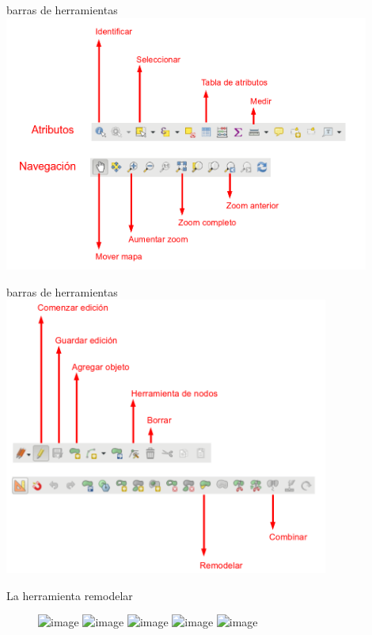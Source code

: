 \documentclass{beamer}
\begin{document}
\begin{frame}{barras de herramientas}
	\centering
	\includegraphics[width=0.9\textwidth]{tb2}
\end{frame}

\begin{frame}{barras de herramientas}
	\centering
	\includegraphics[width=0.8\textwidth]{tb3}
\end{frame}

\begin{frame}{La herramienta remodelar}
		    \begin{figure}
			    	\includegraphics<1>[width=0.8\textwidth]{rem1}
			    	\includegraphics<2>[width=0.8\textwidth]{rem2}
			    	\includegraphics<3>[width=0.8\textwidth]{rem3}
			    	\includegraphics<4>[width=0.8\textwidth]{rem4}
			    	\includegraphics<5>[width=0.8\textwidth]{rem5}
			    \end{figure} 
\end{frame}
\end{document}
